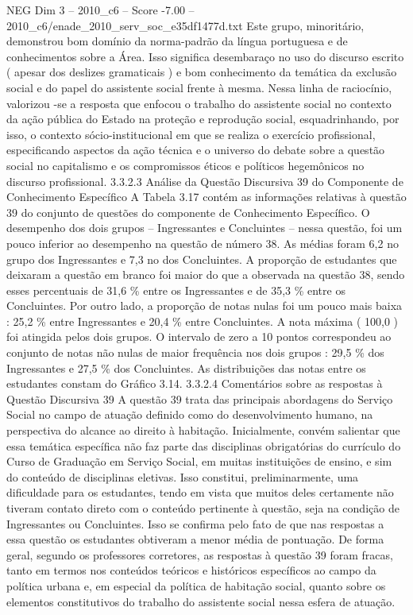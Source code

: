 \begin{textsample}{NEG Dim 3 – 2010\_c6 – Score -7.00 – 2010\_c6/enade\_2010\_serv\_soc\_e35df1477d.txt}
Este grupo, minoritário, demonstrou bom domínio da norma-padrão da língua portuguesa e de conhecimentos sobre a Área.
Isso significa desembaraço no uso do discurso escrito ( apesar dos deslizes gramaticais ) e bom conhecimento da temática da exclusão social e do papel do assistente social frente à mesma.
Nessa linha de raciocínio, valorizou -se a resposta que enfocou o trabalho do assistente social no contexto da ação pública do Estado na proteção e reprodução social, esquadrinhando, por isso, o contexto sócio-institucional em que se realiza o exercício profissional, especificando aspectos da ação técnica e o universo do debate sobre a questão social no capitalismo e os compromissos éticos e políticos hegemônicos no discurso profissional. 3.3.2.3 Análise da Questão Discursiva 39 do Componente de Conhecimento Específico A Tabela 3.17 contém as informações relativas à questão 39 do conjunto de questões do componente de Conhecimento Específico.
O desempenho dos dois grupos – Ingressantes e Concluintes – nessa questão, foi um pouco inferior ao desempenho na questão de número 38.
As médias foram 6,2 no grupo dos Ingressantes e 7,3 no dos Concluintes.
A proporção de estudantes que deixaram a questão em branco foi maior do que a observada na questão 38, sendo esses percentuais de 31,6 \% entre os Ingressantes e de 35,3 \% entre os Concluintes.
Por outro lado, a proporção de notas nulas foi um pouco mais baixa : 25,2 \% entre Ingressantes e 20,4 \% entre Concluintes.
A nota máxima ( 100,0 ) foi atingida pelos dois grupos.
O intervalo de zero a 10 pontos correspondeu ao conjunto de notas não nulas de maior frequência nos dois grupos : 29,5 \% dos Ingressantes e 27,5 \% dos Concluintes.
As distribuições das notas entre os estudantes constam do Gráfico 3.14. 3.3.2.4 Comentários sobre as respostas à Questão Discursiva 39 A questão 39 trata das principais abordagens do Serviço Social no campo de atuação definido como do desenvolvimento humano, na perspectiva do alcance ao direito à habitação.
Inicialmente, convém salientar que essa temática específica não faz parte das disciplinas obrigatórias do currículo do Curso de Graduação em Serviço Social, em muitas instituições de ensino, e sim do conteúdo de disciplinas eletivas.
Isso constitui, preliminarmente, uma dificuldade para os estudantes, tendo em vista que muitos deles certamente não tiveram contato direto com o conteúdo pertinente à questão, seja na condição de Ingressantes ou Concluintes.
Isso se confirma pelo fato de que nas respostas a essa questão os estudantes obtiveram a menor média de pontuação.
De forma geral, segundo os professores corretores, as respostas à questão 39 foram fracas, tanto em termos nos conteúdos teóricos e históricos específicos ao campo da política urbana e, em especial da política de habitação social, quanto sobre os elementos constitutivos do trabalho do assistente social nessa esfera de atuação.

\end{textsample}
